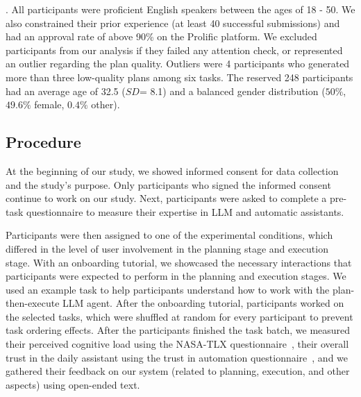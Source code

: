 . All participants were proficient English speakers between the ages of 18 - 50. 
We also constrained their prior experience (at least 40 successful submissions) and had an approval rate of above 90\% on the Prolific platform. 
We excluded participants from our analysis if they failed any attention check, or represented an outlier regarding the plan quality. 
Outliers were 4 participants who generated more than three low-quality plans among six tasks. 
The reserved 248 participants had an average age of 32.5 ($SD$= 8.1) and a balanced gender distribution
($50\%$, $49.6\%$ female, $0.4\%$ other).




\subsection{Procedure}
At the beginning of our study, we showed informed consent for data collection and the study's purpose. 
Only participants who signed the informed consent  continue to work on our study. 
Next, participants were asked to complete a pre-task questionnaire to measure their expertise in LLM and automatic assistants. %

Participants were then assigned to one of the experimental conditions, which differed in the level of user involvement in the planning stage and execution stage. 
With an onboarding tutorial, we showcased the necessary interactions that participants were expected to perform in the planning and execution stages. 
We used an example task to help participants understand how to work with the plan-then-execute LLM agent. 
After the onboarding tutorial, participants worked on the selected tasks, which were shuffled at random for every participant to prevent task ordering effects. 
After the participants finished the task batch, we measured their perceived cognitive load using the NASA-TLX questionnaire~\cite{colligan2015cognitive}, their overall trust in the daily assistant using the trust in automation questionnaire~\cite{korber2019theoretical}, and we gathered their feedback on our system (related to planning, execution, and other aspects) using open-ended text.